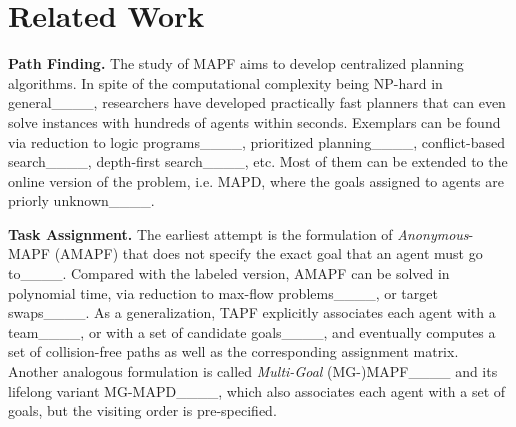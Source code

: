 \section{Related Work}
\label{sec:related}

\textbf{Path Finding.}
The study of MAPF aims to develop centralized planning algorithms.
In spite of the computational complexity being NP-hard in general____,
researchers have developed practically fast planners that can even solve instances with hundreds of agents within seconds.
Exemplars can be found via reduction to logic programs____,
prioritized planning____,
conflict-based search____, 
depth-first search____, etc.
Most of them can be extended to the online version of the problem, i.e. MAPD,
where the goals assigned to agents are priorly unknown____.


\textbf{Task Assignment.}
The earliest attempt is the formulation of \textit{Anonymous}-MAPF (AMAPF) that does not specify the exact goal that an agent must go to____.
Compared with the labeled version, AMAPF can be solved in polynomial time,
via reduction to max-flow problems____, or target swaps____.
As a generalization,
TAPF explicitly associates each agent with a team____, or with a set of candidate goals____,
and eventually computes a set of collision-free paths as well as the corresponding assignment matrix.
Another analogous formulation is called \textit{Multi-Goal} (MG-)MAPF____ and its lifelong variant MG-MAPD____, which also associates each agent with a set of goals, but the visiting order is pre-specified.



